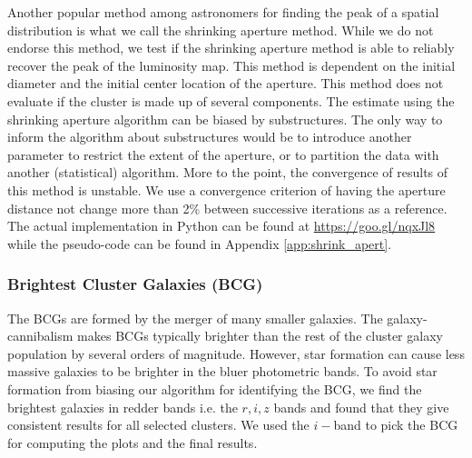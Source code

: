 Another popular method among astronomers for finding the peak of a spatial
distribution is what we call the shrinking aperture method.
While we do not endorse this method,
we test if the shrinking aperture method is able to reliably recover the 
peak of the luminosity map.
This method is dependent on the initial diameter and the initial center 
location of the aperture.
This method does not evaluate if the cluster is made up of
several components.
The estimate using the shrinking aperture algorithm can be biased by
substructures. The only way to inform the algorithm about substructures would
be to introduce another parameter to restrict the extent of the aperture, or to
partition the data with another (statistical) algorithm.
More to the point, the convergence of results of this method is unstable. We use a
convergence criterion of having the aperture distance not change more than 2\% 
between successive iterations as a reference. The actual implementation in
{\sc Python} can be found at \href{https://goo.gl/nqxJl8}{https://goo.gl/nqxJl8} while
the pseudo-code can be found in Appendix \ref{app:shrink_apert}.

\subsubsection{Brightest Cluster Galaxies (BCG)}
The BCGs are formed by the merger of many smaller
galaxies. The galaxy-cannibalism makes BCGs typically brighter than the rest of 
the cluster galaxy population by several orders of magnitude. 
However, star formation can cause
less massive galaxies to be brighter in the bluer photometric bands.
To avoid star formation from biasing our algorithm for identifying the
BCG, we find the brightest galaxies in redder bands i.e. the $r, i, z$
bands and found that they give consistent results for all selected clusters. 
We used the $i-$band to pick the BCG for computing the plots and the final results. 
 
